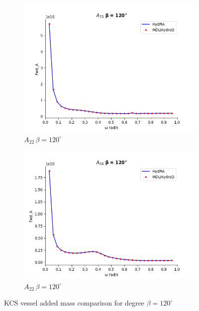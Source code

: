 \begin{figure}[H]
\begin{subfigure}[b]{0.45\textwidth}
        \includegraphics[width=\textwidth]{plots/kvlcc/added_mass/a55.png}
        \caption{$A_{22} \, \beta = 120^{\circ}$}
    \end{subfigure}
    \begin{subfigure}[b]{0.45\textwidth}
        \includegraphics[width=\textwidth]{plots/kvlcc/added_mass/a66.png}
        \caption{$A_{22} \, \beta = 120^{\circ}$}
    \end{subfigure}
    \caption{KCS vessel added mass comparison for degree $\beta=120^{\circ}$}
    \label{fig:kvlcc_addedmass}
\end{figure}

